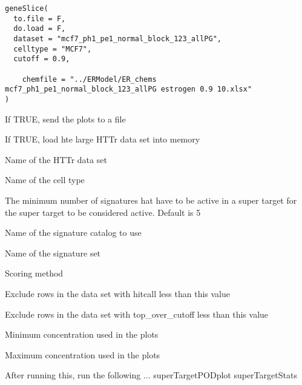\documentclass[letterpaper]{book}
\begin{document}
%
\begin{Usage}
\begin{verbatim}
geneSlice(
  to.file = F,
  do.load = F,
  dataset = "mcf7_ph1_pe1_normal_block_123_allPG",
  celltype = "MCF7",
  cutoff = 0.9,
 
    chemfile = "../ERModel/ER_chems mcf7_ph1_pe1_normal_block_123_allPG estrogen 0.9 10.xlsx"
)
\end{verbatim}
\end{Usage}
%
\begin{Arguments}
\begin{ldescription}
\item[\code{to.file}] If TRUE, send the plots to a file

\item[\code{do.load}] If TRUE, load hte large HTTr data set into memory

\item[\code{dataset}] Name of the HTTr data set

\item[\code{celltype}] Name of the cell type

\item[\code{cutoff}] The minimum number of signatures hat have to be active in a super
target for the super target to be considered active. Default is 5

\item[\code{sigcatalog}] Name of the signature catalog to use

\item[\code{sigset}] Name of the signature set

\item[\code{method}] Scoring method

\item[\code{hccut}] Exclude rows in the data set with hitcall less than this value

\item[\code{tccut}] Exclude rows in the data set with top\_over\_cutoff less than this value

\item[\code{minconc}] Minimum concentration used in the plots

\item[\code{maxconc}] Maximum concentration used in the plots

After running this, run the following ...
superTargetPODplot
superTargetStats
\end{ldescription}
\end{Arguments}
\end{document}
